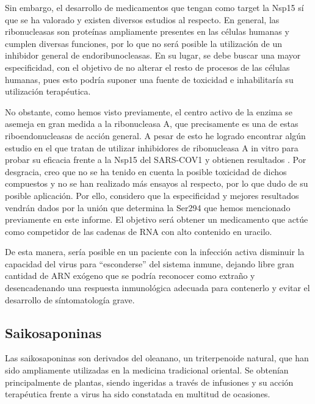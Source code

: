 \documentclass[12pt]{article}
\begin{document}
Sin embargo, el desarrollo de medicamentos que tengan como target la Nsp15 sí que se ha valorado y existen diversos estudios al respecto. En general, las ribonucleasas son proteínas ampliamente presentes en las células humanas y cumplen diversas funciones, por lo que no será posible la utilización de un inhibidor general de endoribunocleasas. En su lugar, se debe buscar una mayor especificidad, con el objetivo de no alterar el resto de procesos de las células humanas, pues esto podría suponer una fuente de toxicidad e inhabilitaría su utilización terapéutica.
\newline

No obstante, como hemos visto previamente, el centro activo de la enzima se asemeja en gran medida a la ribonucleasa A, que precisamente es una de estas riboendonucleasas de acción general. A pesar de esto he logrado encontrar algún estudio en el que tratan de utilizar inhibidores de ribonucleasa A in vitro para probar su eficacia frente a la Nsp15 del SARS-COV1 y obtienen resultados \cite{Alcantara}. Por desgracia, creo que no se ha tenido en cuenta la posible toxicidad de dichos compuestos y no se han realizado más ensayos al respecto, por lo que dudo de su posible aplicación. Por ello, considero que la especificidad y mejores resultados vendrán dados por la unión que determina la Ser294 que hemos mencionado previamente en este informe. El objetivo será obtener un medicamento que actúe como competidor de las cadenas de RNA con alto contenido en uracilo.
\newline

De esta manera, sería posible en un paciente con la infección activa disminuir la capacidad del virus para ``esconderse'' del sistema inmune, dejando libre gran cantidad de ARN exógeno que se podría reconocer como extraño y desencadenando una respuesta inmunológica adecuada para contenerlo y evitar el desarrollo de síntomatología grave.
\newline

\subsection{Saikosaponinas}
Las saikosaponinas son derivados del oleanano, un triterpenoide natural, que han sido ampliamente utilizadas en la medicina tradicional oriental. Se obtenían principalmente de plantas, siendo ingeridas a través de infusiones y su acción terapéutica frente a virus ha sido constatada en multitud de ocasiones. 
\newline
\end{document}
